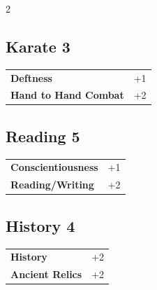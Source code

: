 \begin{multicols}{2}
\begin{tcolorbox}
    \subsection*{Karate \hfill \small{3 }}
    \tcblower




\begin{tabular}{@{}ll@{}}
    \textbf{Deftness} & +1\\
    \textbf{Hand to Hand Combat} & +2\\
\end{tabular}


\end{tcolorbox}

\begin{tcolorbox}
    \subsection*{Reading \hfill \small{5 }}
    \tcblower




\begin{tabular}{@{}ll@{}}
    \textbf{Conscientiousness} & +1\\
    \textbf{Reading/Writing} & +2\\
\end{tabular}


\end{tcolorbox}

\begin{tcolorbox}
    \subsection*{History \hfill \small{4 }}
    \tcblower




\begin{tabular}{@{}ll@{}}
    \textbf{History} & +2\\
    \textbf{Ancient Relics} & +2\\
\end{tabular}


\end{tcolorbox}
\end{multicols}
